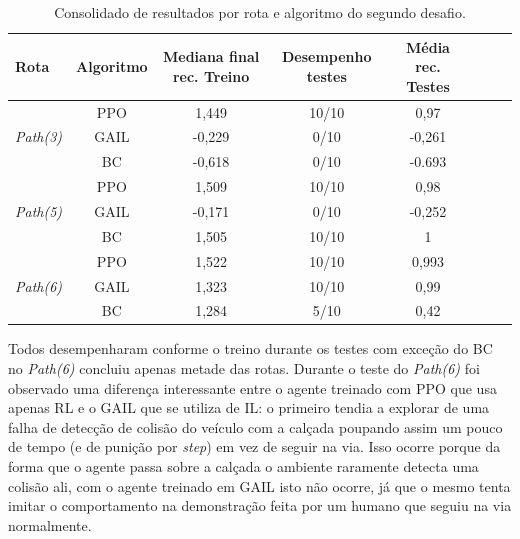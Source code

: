 \begin{table}[htpb]
    \centering
    \caption{Consolidado de resultados por rota e algoritmo do segundo desafio.}
    \label{resultado-tabela-desafio-2}
    \begin{tabular}{|l|c|c|c|c|c|c|r|}
         \hline
         \small{Rota} & \small{Algoritmo}   & \small{Mediana final rec. Treino}  & \small{Desempenho testes}    & \small{Média rec. Testes}                       \\ \hline
         \multirow{3}{*}{\textit{Path(3)}}  &      PPO            &   1,449                            &    10/10                     &      0,97                 \\ \cline{2-5}
                                            &      GAIL           &   -0,229                           &    0/10                      &      -0,261               \\ \cline{2-5}
                                            &      BC             &   -0,618                           &    0/10                      &      -0.693               \\ \hline
         \multirow{3}{*}{\textit{Path(5)}}  &      PPO            &   1,509                            &    10/10                     &      0,98                 \\ \cline{2-5}
                                            &      GAIL           &   -0,171                           &    0/10                      &      -0,252               \\ \cline{2-5}
                                            &      BC             &   1,505                            &    10/10                     &      1                    \\ \hline
         \multirow{3}{*}{\textit{Path(6)}}  &      PPO            &   1,522                            &    10/10                     &      0,993                \\ \cline{2-5}
                                            &      GAIL           &   1,323                            &    10/10                     &      0,99                 \\ \cline{2-5}
                                            &      BC             &   1,284                            &    5/10                      &      0,42                 \\ \hline
    \end{tabular}
\end{table}

Todos desempenharam conforme o treino durante os testes com exceção do BC no \textit{Path(6)} concluiu apenas metade das rotas. Durante o teste do \textit{Path(6)} foi observado uma diferença interessante entre o agente treinado com PPO que usa apenas RL e o GAIL que se utiliza de IL: o primeiro tendia a explorar de uma falha de detecção de colisão do veículo com a calçada poupando assim um pouco de tempo (e de punição por \textit{step}) em vez de seguir na via. Isso ocorre porque da forma que o agente passa sobre a calçada o ambiente raramente detecta uma colisão ali, com o agente treinado em GAIL isto não ocorre, já que o mesmo tenta imitar o comportamento na demonstração feita por um humano que seguiu na via normalmente.

